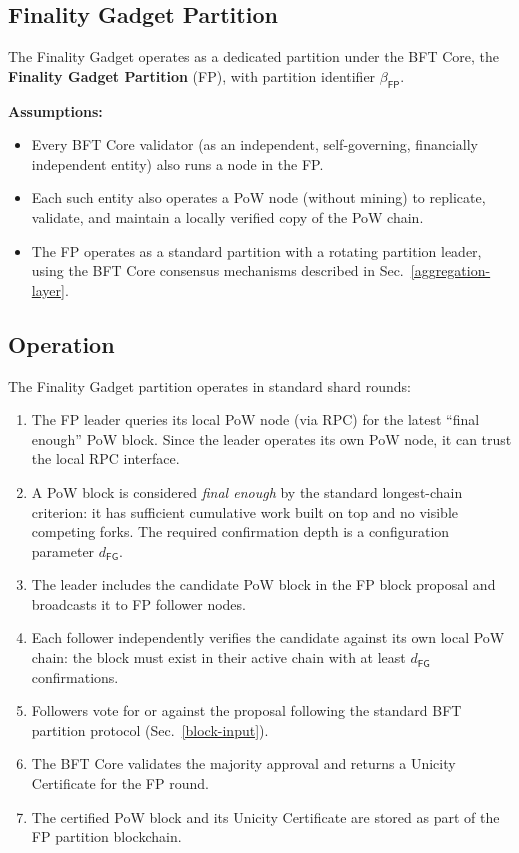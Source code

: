 \subsection{Finality Gadget Partition}\label{sec:fg-partition}

The Finality Gadget operates as a dedicated partition under the BFT Core, the \textbf{Finality Gadget Partition} (FP), with partition identifier $\beta_\mathsf{FP}$.

\textbf{Assumptions:}
\begin{itemize}[nosep]
  \item Every BFT Core validator (as an independent, self-governing, financially independent entity) also runs a node in the FP.
  \item Each such entity also operates a PoW node (without mining) to replicate, validate, and maintain a locally verified copy of the PoW chain.
  \item The FP operates as a standard partition with a rotating partition leader, using the BFT Core consensus mechanisms described in Sec.~\ref{aggregation-layer}.
\end{itemize}


\subsection{Operation}\label{sec:fg-operation}

The Finality Gadget partition operates in standard shard rounds:

\begin{enumerate}
  \item The FP leader queries its local PoW node (via RPC) for the latest ``final enough'' PoW block. Since the leader operates its own PoW node, it can trust the local RPC interface.
  \item A PoW block is considered \emph{final enough} by the standard longest-chain criterion: it has sufficient cumulative work built on top and no visible competing forks. The required confirmation depth is a configuration parameter $d_\mathsf{FG}$.
  \item The leader includes the candidate PoW block in the FP block proposal and broadcasts it to FP follower nodes.
  \item Each follower independently verifies the candidate against its own local PoW chain: the block must exist in their active chain with at least $d_\mathsf{FG}$ confirmations.
  \item Followers vote for or against the proposal following the standard BFT partition protocol (Sec.~\ref{block-input}).
  \item The BFT Core validates the majority approval and returns a Unicity Certificate for the FP round.
  \item The certified PoW block and its Unicity Certificate are stored as part of the FP partition blockchain.
\end{enumerate}

